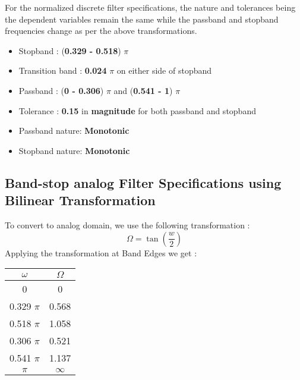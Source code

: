 \documentclass{article}
\begin{document}
\vspace{1em}
\noindent
For the normalized discrete filter specifications, the nature and tolerances being the dependent variables remain the same while the passband and stopband frequencies change as per the above transformations. 
\begin{itemize}
    \item Stopband : (\textbf{0.329 -  0.518}) {$\pi$}
    \item  Transition band : \textbf{0.024} $\pi$ on either side of stopband
    \item Passband : (\textbf{0 - 0.306}) {$\pi$} and (\textbf{0.541 - 1}) {$\pi$}
    \item  Tolerance : \textbf{0.15} in \textbf{magnitude} for both passband and stopband
    \item Passband nature: \textbf{Monotonic}
    \item Stopband nature: \textbf{Monotonic}
\end{itemize}

\subsection{Band-stop analog Filter Specifications using Bilinear
Transformation}
To convert to analog domain, we use the following transformation :
\begin{equation*}
    \Omega = \tan (\frac{w}{2})
\end{equation*}
Applying the transformation at Band Edges we get :
\begin{table}[H]
		\begin{center}
		\begin{tabular}{|c|c|}
			\hline
			$\omega$ & $\Omega$\\
			
			\hline
                0 & 0\\
                \hline
                0.329 $\pi$ & 0.568 \\
                \hline
                0.518 $\pi$ & 1.058\\
                \hline
                0.306 $\pi$ & 0.521\\
                \hline
                0.541 $\pi$ & 1.137\\
                \hline
                $\pi$ & $\infty$\\
                \hline
            
		\end{tabular}
		\end{center}
\end{table}
\end{document}
